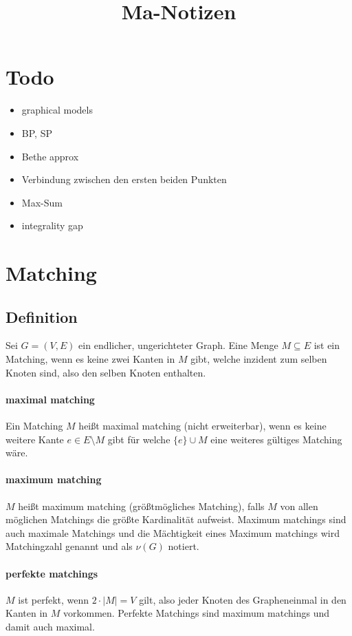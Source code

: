 \documentclass[paper=a4,10pt]{scrartcl}
\begin{document}
\title{Ma-Notizen}

\section{Todo}
\begin{itemize}
\item graphical models
\item BP, SP
\item Bethe approx
\item Verbindung zwischen den ersten beiden Punkten
\item Max-Sum
\item integrality gap
\end{itemize}

\section{Matching}
\subsection{Definition}
Sei $G=(V,E)$ ein endlicher, ungerichteter Graph. Eine Menge $M\subseteq E$ ist ein Matching, wenn es keine zwei Kanten in $M$ gibt, welche inzident zum selben Knoten sind, also den selben Knoten enthalten.

\paragraph{maximal matching}
Ein Matching $M$ heißt maximal matching (nicht erweiterbar), wenn es keine weitere Kante $e \in E \setminus M$ gibt für welche $\{ e\} \cup M$ eine weiteres gültiges Matching wäre.

\paragraph{maximum matching}
$M$ heißt maximum matching (größtmögliches Matching), falls $M$ von allen möglichen Matchings die größte Kardinalität aufweist. Maximum matchings sind auch maximale Matchings und die Mächtigkeit eines Maximum matchings wird Matchingzahl genannt und als $\nu(G)$ notiert.

\paragraph{perfekte matchings}
$M$ ist perfekt, wenn $2 \cdot |M| = V$ gilt, also jeder Knoten des Grapheneinmal in den Kanten in $M$ vorkommen. Perfekte Matchings sind maximum matchings und damit auch maximal. 
\end{document}
